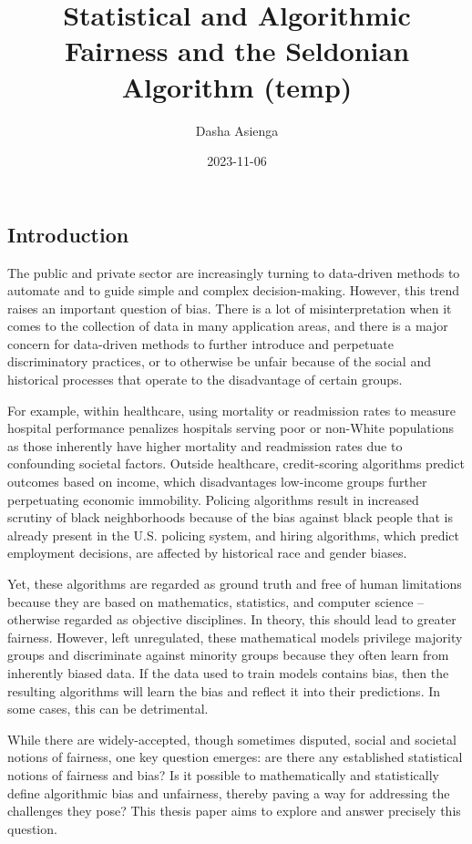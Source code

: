 \documentclass[
]{article}
\title{Statistical and Algorithmic Fairness and the Seldonian Algorithm
(temp)}
\author{Dasha Asienga}
\date{2023-11-06}
\begin{document}
\maketitle

\fontsize{12}{22}
\selectfont

\hypertarget{introduction}{%
\subsection{Introduction}\label{introduction}}

The public and private sector are increasingly turning to data-driven
methods to automate and to guide simple and complex decision-making.
However, this trend raises an important question of bias. There is a lot
of misinterpretation when it comes to the collection of data in many
application areas, and there is a major concern for data-driven methods
to further introduce and perpetuate discriminatory practices, or to
otherwise be unfair because of the social and historical processes that
operate to the disadvantage of certain groups.

For example, within healthcare, using mortality or readmission rates to
measure hospital performance penalizes hospitals serving poor or
non-White populations as those inherently have higher mortality and
readmission rates due to confounding societal factors. Outside
healthcare, credit-scoring algorithms predict outcomes based on income,
which disadvantages low-income groups further perpetuating economic
immobility. Policing algorithms result in increased scrutiny of black
neighborhoods because of the bias against black people that is already
present in the U.S. policing system, and hiring algorithms, which
predict employment decisions, are affected by historical race and gender
biases.

Yet, these algorithms are regarded as ground truth and free of human
limitations because they are based on mathematics, statistics, and
computer science -- otherwise regarded as objective disciplines. In
theory, this should lead to greater fairness. However, left unregulated,
these mathematical models privilege majority groups and discriminate
against minority groups because they often learn from inherently biased
data. If the data used to train models contains bias, then the resulting
algorithms will learn the bias and reflect it into their predictions. In
some cases, this can be detrimental.

While there are widely-accepted, though sometimes disputed, social and
societal notions of fairness, one key question emerges: are there any
established statistical notions of fairness and bias? Is it possible to
mathematically and statistically define algorithmic bias and unfairness,
thereby paving a way for addressing the challenges they pose? This
thesis paper aims to explore and answer precisely this question.
\end{document}
